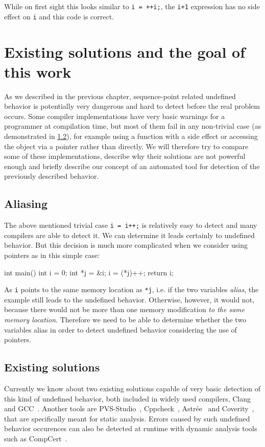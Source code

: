 While on first sight this looks similar to \verb|i = ++i;|, the \verb|i+1| expression has no side effect on \verb|i| and this code is correct.

\chapter{Existing solutions and the goal of this work}
As we described in the previous chapter, sequence-point related undefined behavior is potentially very dangerous and hard to detect before the real problem occurs. Some compiler implementations have very basic warnings for a programmer at compilation time, but most of them fail in any non-trivial case (as demonstrated in \ref{test-of-others}), for example using a function with a side effect or accessing the object via a pointer rather than directly. We will therefore try to compare some of these implementations, describe why their solutions are not powerful enough and briefly describe our concept of an automated tool for detection of the previously described behavior.
\section{Aliasing}
The above mentioned trivial case \verb|i = i++;| is relatively easy to detect and many compilers are able to detect it.
We can determine it leads certainly to undefined behavior. But this decision is much more complicated when we consider using pointers as in this simple case:
\\\begin{code}
int main(){
	int i = 0;
	int *j = &i;
	i = (*j)++;
    return i;
}
\end{code}

As \verb|i| points to the same memory location as \verb|*j|, i.e. if the two variables \emph{alias}, the example still leads to the undefined behavior. Otherwise, however, it would not, because there would not be more than one memory modification \emph{to the same memory location}. Therefore we need to be able to determine whether the two variables alias in order to detect undefined behavior considering the use of pointers.
\section{Existing solutions}\label{test-of-others}
Currently we know about two existing solutions capable of very basic detection of this kind of undefined behavior, both included in widely used compilers, Clang~\cite{Clang} and GCC~\cite{GCC}. Another tools are PVS-Studio~\cite{PVSStudio}, Cppcheck~\cite{cppcheck}, Astrée~\cite{astree} and Coverity~\cite{coverity}, that are specifically meant for static analysis. Errors caused by such undefined behavior occurences can also be detected at runtime with dynamic analysis tools such as CompCert~\cite{CompCert}.
